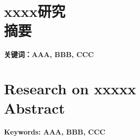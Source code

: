 \chapter*{xxxx研究\\ \vspace{1cm}摘要}

\textbf{关键词：AAA, BBB, CCC}
\bigskip %


\chapter*{Research on xxxxx\\ \vspace{1cm}Abstract}

\textbf{Keywords: AAA, BBB, CCC}